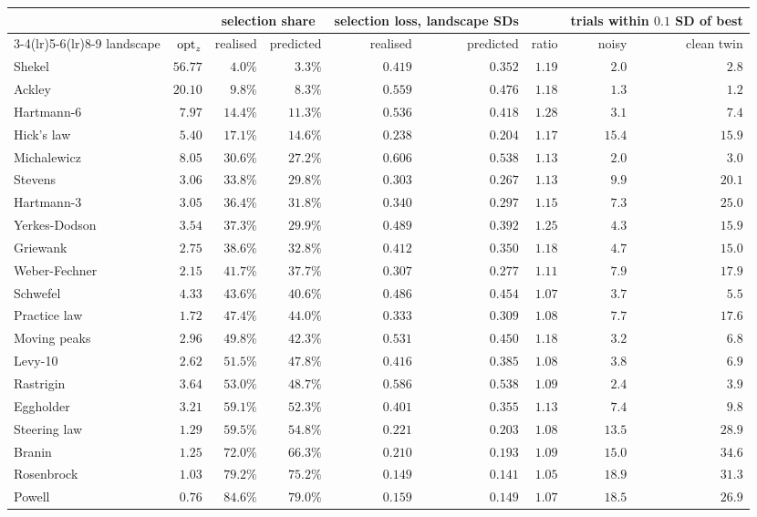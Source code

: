 \begin{tabular}{lr rr rr r rr}
\toprule
 & & \multicolumn{2}{c}{selection share} & \multicolumn{2}{c}{selection loss, landscape SDs} & & \multicolumn{2}{c}{trials within $0.1$ SD of best} \\
\cmidrule(lr){3-4}\cmidrule(lr){5-6}\cmidrule(lr){8-9}
landscape & $\mathrm{opt}_z$ & realised & predicted & realised & predicted & ratio & noisy & clean twin \\
\midrule
Shekel & $56.77$ & $4.0\%$ & $3.3\%$ & $0.419$ & $0.352$ & $1.19$ & $2.0$ & $2.8$ \\
Ackley & $20.10$ & $9.8\%$ & $8.3\%$ & $0.559$ & $0.476$ & $1.18$ & $1.3$ & $1.2$ \\
Hartmann-6 & $7.97$ & $14.4\%$ & $11.3\%$ & $0.536$ & $0.418$ & $1.28$ & $3.1$ & $7.4$ \\
Hick's law & $5.40$ & $17.1\%$ & $14.6\%$ & $0.238$ & $0.204$ & $1.17$ & $15.4$ & $15.9$ \\
Michalewicz & $8.05$ & $30.6\%$ & $27.2\%$ & $0.606$ & $0.538$ & $1.13$ & $2.0$ & $3.0$ \\
Stevens & $3.06$ & $33.8\%$ & $29.8\%$ & $0.303$ & $0.267$ & $1.13$ & $9.9$ & $20.1$ \\
Hartmann-3 & $3.05$ & $36.4\%$ & $31.8\%$ & $0.340$ & $0.297$ & $1.15$ & $7.3$ & $25.0$ \\
Yerkes-Dodson & $3.54$ & $37.3\%$ & $29.9\%$ & $0.489$ & $0.392$ & $1.25$ & $4.3$ & $15.9$ \\
Griewank & $2.75$ & $38.6\%$ & $32.8\%$ & $0.412$ & $0.350$ & $1.18$ & $4.7$ & $15.0$ \\
Weber-Fechner & $2.15$ & $41.7\%$ & $37.7\%$ & $0.307$ & $0.277$ & $1.11$ & $7.9$ & $17.9$ \\
Schwefel & $4.33$ & $43.6\%$ & $40.6\%$ & $0.486$ & $0.454$ & $1.07$ & $3.7$ & $5.5$ \\
Practice law & $1.72$ & $47.4\%$ & $44.0\%$ & $0.333$ & $0.309$ & $1.08$ & $7.7$ & $17.6$ \\
Moving peaks & $2.96$ & $49.8\%$ & $42.3\%$ & $0.531$ & $0.450$ & $1.18$ & $3.2$ & $6.8$ \\
Levy-10 & $2.62$ & $51.5\%$ & $47.8\%$ & $0.416$ & $0.385$ & $1.08$ & $3.8$ & $6.9$ \\
Rastrigin & $3.64$ & $53.0\%$ & $48.7\%$ & $0.586$ & $0.538$ & $1.09$ & $2.4$ & $3.9$ \\
Eggholder & $3.21$ & $59.1\%$ & $52.3\%$ & $0.401$ & $0.355$ & $1.13$ & $7.4$ & $9.8$ \\
Steering law & $1.29$ & $59.5\%$ & $54.8\%$ & $0.221$ & $0.203$ & $1.08$ & $13.5$ & $28.9$ \\
Branin & $1.25$ & $72.0\%$ & $66.3\%$ & $0.210$ & $0.193$ & $1.09$ & $15.0$ & $34.6$ \\
Rosenbrock & $1.03$ & $79.2\%$ & $75.2\%$ & $0.149$ & $0.141$ & $1.05$ & $18.9$ & $31.3$ \\
Powell & $0.76$ & $84.6\%$ & $79.0\%$ & $0.159$ & $0.149$ & $1.07$ & $18.5$ & $26.9$ \\
\bottomrule
\end{tabular}
